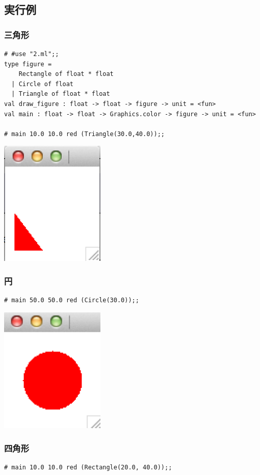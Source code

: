 \documentclass[a4paper,9pt]{jsarticle}
\begin{document}
\subsection{実行例}
\subsubsection{三角形}
\begin{lstlisting}
# #use "2.ml";;
type figure =
    Rectangle of float * float
  | Circle of float
  | Triangle of float * float
val draw_figure : float -> float -> figure -> unit = <fun>
val main : float -> float -> Graphics.color -> figure -> unit = <fun>

# main 10.0 10.0 red (Triangle(30.0,40.0));;
\end{lstlisting}

\includegraphics[width=5cm]{2_1.png}
\newpage
\subsubsection{円}
\begin{lstlisting}
# main 50.0 50.0 red (Circle(30.0));;
\end{lstlisting}
\includegraphics[width=5cm]{2_2.png}

\subsubsection{四角形}
\begin{lstlisting}
# main 10.0 10.0 red (Rectangle(20.0, 40.0));;
\end{lstlisting}
\end{document}
